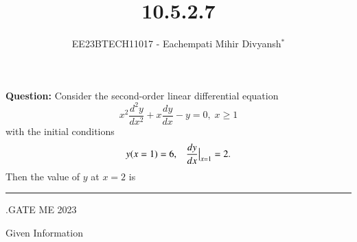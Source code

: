 \documentclass[journal,12pt,twocolumn]{IEEEtran}
\theoremstyle{remark}
\begin{document}

\vspace{3cm}

\title{10.5.2.7}
\author{EE23BTECH11017 - Eachempati Mihir Divyansh$^{*}$}
\maketitle
\newpage
\bigskip

\renewcommand{\thefigure}{\theenumi}
\renewcommand{\thetable}{\theenumi}
\textbf{Question:} Consider the second-order linear differential equation
\[x^2\frac{d^2y}{dx^2}+x\frac{dy}{dx}-y=0, \; x\geq 1\]
with the initial conditions $$y(x=1)=6,\; \;\; \frac{dy}{dx}\big{|}_{x=1}=2.$$
Then the value of $y$ at $x=2$ is \rule{2cm}{0.1mm}.{\hfill{GATE ME 2023}}\\

\solution
\begin{table}[h!]
    \centering
    
    \caption{Given Information} \label{gateME49.tab:1}
\end{table}
\end{document}
